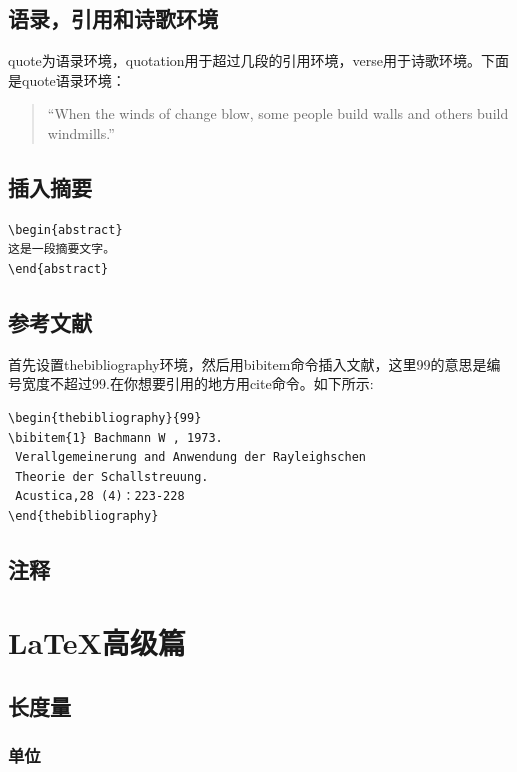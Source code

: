 \documentclass[11pt,oneside]{book}
\begin{document}
\begin{common-format}
\section{语录，引用和诗歌环境}
quote为语录环境，quotation用于超过几段的引用环境，verse用于诗歌环境。下面是quote语录环境：
\begin{quote}
“When the winds of change blow, some people build walls and others build windmills.”
\end{quote}


\section{插入摘要}
\begin{Verbatim}
\begin{abstract}
这是一段摘要文字。
\end{abstract}
\end{Verbatim}


\section{参考文献}
首先设置thebibliography环境，然后用bibitem命令插入文献，这里99的意思是编号宽度不超过99.在你想要引用的地方用cite命令。如下所示:

\begin{Verbatim}
\begin{thebibliography}{99}
\bibitem{1} Bachmann W , 1973.
 Verallgemeinerung and Anwendung der Rayleighschen 
 Theorie der Schallstreuung.
 Acustica,28 (4)：223-228
\end{thebibliography}
\end{Verbatim}

\section{注释}
\showendnotes


\chapter{\LaTeX 高级篇}

\section{长度量}
\subsection{单位}


\end{common-format}
\end{document}
